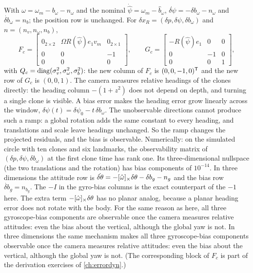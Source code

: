 \begin{solutions}
  \item With $\omega = \omega_m - b_\omega - n_\omega$ and the nominal $\dot{\hat\psi} = \omega_m - \hat b_\omega$, $\dot{\delta\psi} = -\delta b_\omega - n_\omega$ and $\dot{\delta b}_\omega = n_b$; the position row is unchanged. For
        $\delta x_R = (\delta p, \delta\psi, \delta b_\omega)$ and $n = (n_v, n_\omega, n_b)$,
        \[
          F_c = \begin{bmatrix} 0_{2\times2} & \Omega R(\hat\psi)e_1v_m & 0_{2\times1} \\ 0 & 0 & -1 \\ 0 & 0 & 0 \end{bmatrix}, \qquad
          G_c = \begin{bmatrix} -R(\hat\psi)e_1 & 0 & 0 \\ 0 & -1 & 0 \\ 0 & 0 & 1 \end{bmatrix},
        \]
        with $Q_c = \operatorname{diag}(\sigma_v^2, \sigma_\omega^2, \sigma_b^2)$: the new column of $F_c$ is $(0, 0, -1, 0)^{\mathsf{T}}$ and the new row of $G_c$ is $(0, 0, 1)$. The camera measures relative headings of
        the clones directly: the heading column $-(1 + z^2)$ does not depend on depth, and turning a single clone is visible. A bias error makes the heading error grow
        linearly across the window, $\delta\psi(t) = \delta\psi_0 - t\,\delta b_\omega$. The unobservable directions cannot produce such a ramp: a global rotation adds the same constant to every
        heading, and translations and scale leave headings unchanged. So the ramp changes the projected residuals, and the bias is observable. Numerically: on
        the simulated circle with ten clones and six landmarks, the observability matrix of $(\delta p, \delta\psi, \delta b_\omega)$ at the first clone time has rank one. Its
        three-dimensional nullspace (the two translations and the rotation) has bias components of $10^{-14}$.
        \ifsolutions
        In three dimensions the attitude row is $\dot{\delta\theta} = -[\hat\omega]_{\times}\delta\theta - \delta b_g - n_g$ and the bias row $\dot{\delta b}_g = n_{b_g}$. The $-I$ in the gyro-bias columns is the exact
        counterpart of the $-1$ here. The extra term $-[\hat\omega]_{\times}\delta\theta$ has no planar analog, because a planar heading error does not rotate with the body. For the same
        reason as here, all three gyroscope-bias components are observable once the camera measures relative attitudes: even the bias about the vertical,
        although the global yaw is not.
        \else
        In three dimensions the same mechanism makes all three gyroscope-bias components observable once the camera measures relative attitudes: even the bias
        about the vertical, although the global yaw is not. (The corresponding block of $F_c$ is part of the derivation exercises of \cref{ch:errordyn}.)
        \fi


\end{solutions}
